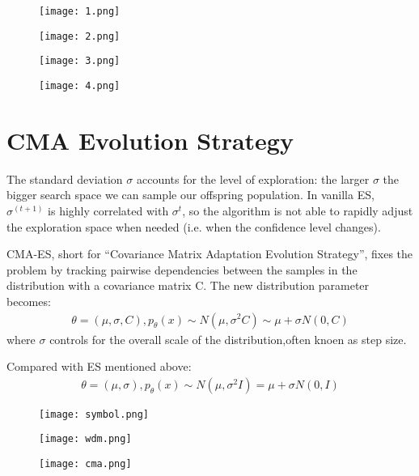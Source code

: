 \documentclass[12pt]{article}
\begin{document}
\begin{figure}[htbp]
	\centering
	\texttt{[image: 1.png]}
\end{figure}
\begin{figure}[htbp]
	\centering
	\texttt{[image: 2.png]}
\end{figure}
\begin{figure}[htbp]
	\centering
	\texttt{[image: 3.png]}
\end{figure}
\begin{figure}[htbp]
	\centering
	\texttt{[image: 4.png]}
\end{figure}

\section{CMA Evolution Strategy}
The standard deviation $\sigma$ accounts for the 
level of exploration: the larger $\sigma$ the bigger 
search space we can sample our offspring population. 
In vanilla ES, $\sigma^{(t+1)}$ is highly correlated 
with $\sigma^{t}$, so the algorithm is not able to rapidly adjust the exploration space when needed (i.e. when the confidence level changes).

CMA-ES, short for “Covariance Matrix Adaptation 
Evolution Strategy”, fixes the problem by tracking 
pairwise dependencies between the samples in the 
distribution with a covariance matrix C. 
The new distribution parameter becomes:
\begin{align}
	\theta=(\mu,\sigma,C),p_\theta(x)\sim N(\mu,\sigma^2C)\sim\mu+\sigma N(0,C)
\end{align}
where $\sigma$ controls for the overall scale of the distribution,often knoen as step size.

Compared with ES mentioned above:
\begin{align}
	\theta=(\mu,\sigma),p_\theta (x)\sim N(\mu,\sigma^2I)=\mu+\sigma N(0,I)
\end{align}

\begin{figure}[htbp]
	\centering
	\texttt{[image: symbol.png]}
\end{figure}

\begin{figure}[htbp]
	\centering
	\texttt{[image: wdm.png]}
\end{figure}

\begin{figure}[htbp]
	\centering
	\texttt{[image: cma.png]}
\end{figure}
\end{document}
